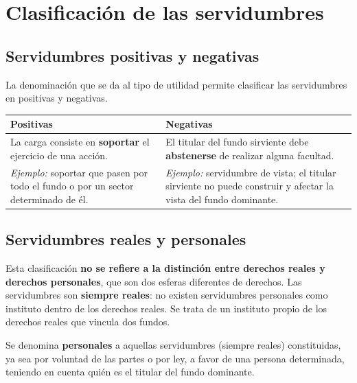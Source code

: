 \documentclass[12pt,oneside]{book}
\begin{document}
\chapter{Clasificación de las servidumbres}

\section{Servidumbres positivas y negativas}

La denominación que se da al tipo de utilidad permite clasificar las servidumbres en positivas y negativas.

\begin{table}[H]
\centering
\begin{tabularx}{\textwidth}{>{\raggedright\arraybackslash}X >{\raggedright\arraybackslash}X}
\toprule
\textbf{Positivas} & \textbf{Negativas} \\
\midrule
La carga consiste en \textbf{soportar} el ejercicio de una acción.
&
El titular del fundo sirviente debe \textbf{abstenerse} de realizar alguna facultad. \\[0.8em]
\textit{Ejemplo:} soportar que pasen por todo el fundo o por un sector determinado de él.
&
\textit{Ejemplo:} servidumbre de vista; el titular sirviente no puede construir y afectar la vista del fundo dominante. \\
\bottomrule
\end{tabularx}
\end{table}

\section{Servidumbres reales y personales}

Esta clasificación \textbf{no se refiere a la distinción entre derechos reales y derechos personales}, que son dos esferas diferentes de derechos. Las servidumbres son \textbf{siempre reales}: no existen servidumbres personales como instituto dentro de los derechos reales. Se trata de un instituto propio de los derechos reales que vincula dos fundos.

Se denomina \textbf{personales} a aquellas servidumbres (siempre reales) constituidas, ya sea por voluntad de las partes o por ley, a favor de una persona determinada, teniendo en cuenta quién es el titular del fundo dominante.
\end{document}
